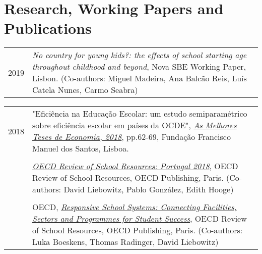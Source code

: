 \documentclass[a4paper,11pt]{article} %
\begin{document}
\section[Research, Working Papers and Publications]{\faBook \hspace{3pt} Research, Working Papers and Publications}

\begin{tabular}{r|p{15cm}}
	2019 &  {\textit{No country for young kids?: the effects of school starting age throughout childhood and beyond}}, Nova SBE Working Paper, Lisbon. (Co-authors: Miguel Madeira, Ana Balcão Reis, Luís Catela Nunes, Carmo Seabra) \\
\end{tabular}

\begin{tabular}{r|p{15cm}}
	2018 &  "Eficiência na Educação Escolar: um estudo semiparamétrico sobre eficiência escolar em países da OCDE", \href{https://www.ffms.pt/FileDownload/d6e1656d-9dde-45e9-871f-0feb67c7d7f8/as-melhores-teses-de-economia-2018}{{\textit{As Melhores Teses de Economia, 2018}}}, pp.62-69, Fundação Francisco Manuel dos Santos, Lisboa.  \\
	& \\
	& \href{http://www.oecd.org/portugal/oecd-reviews-of-school-resources-portugal-2018-9789264308411-en.htm}{\textit{OECD Review of School Resources: Portugal 2018}}, OECD Review of School Resources, OECD Publishing, Paris. (Co-authors: David Liebowitz, Pablo González, Edith Hooge)\\
	& \\
	& OECD,  \href{http://www.oecd.org/publications/responsive-school-systems-9789264306707-en.htm}{\textit{Responsive School Systems: Connecting Facilities, Sectors and Programmes for Student Success}}, OECD Review of School Resources, OECD Publishing, Paris. (Co-authors: Luka Boeskens, Thomas Radinger, David Liebowitz) \\
\end{tabular}	
\end{document}
